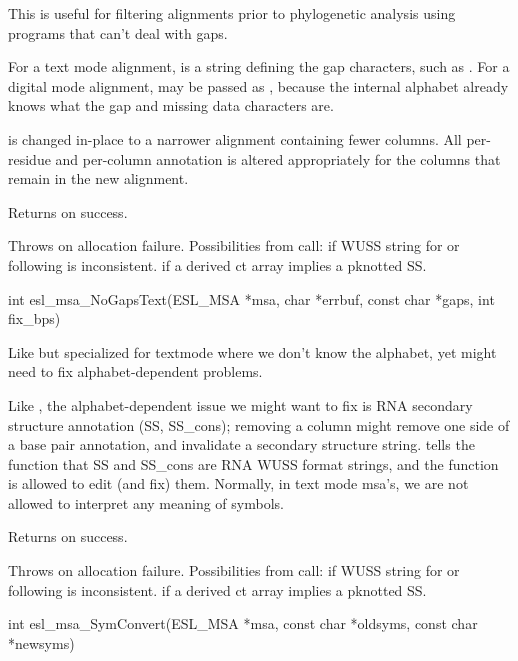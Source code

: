 \begin{sreapi}
This is useful for filtering alignments prior to
phylogenetic analysis using programs that can't deal
with gaps.

For a text mode alignment,  is a string defining
the gap characters, such as . For a digital mode
alignment,  may be passed as , because the
internal alphabet already knows what the gap and
missing data characters are.

 is changed in-place to a narrower alignment
containing fewer columns. All per-residue and per-column
annotation is altered appropriately for the columns that
remain in the new alignment.

Returns  on success.

Throws  on allocation failure.
Possibilities from  call:
 if WUSS string for  or 
following  is inconsistent.
 if a derived ct array implies a pknotted SS.



\hypertarget{func:esl_msa_NoGapsText()}
{\item[int esl\_msa\_NoGapsText(ESL\_MSA *msa, char *errbuf, const char *gaps, int fix\_bps)]}

Like  but specialized for textmode  where
we don't know the alphabet, yet might need to fix alphabet-dependent
problems. 

Like , the alphabet-dependent issue we might
want to fix is RNA secondary structure annotation (SS, SS\_cons);
removing a column might remove one side of a base pair annotation, and
invalidate a secondary structure string.  tells the function
that SS and SS\_cons are RNA WUSS format strings, and the function is
allowed to edit (and fix) them. Normally, in text mode msa's, we
are not allowed to interpret any meaning of symbols.

Returns  on success.

Throws  on allocation failure.
Possibilities from  call:
 if WUSS string for  or 
following  is inconsistent.
 if a derived ct array implies a pknotted SS.


\hypertarget{func:esl_msa_SymConvert()}
{\item[int esl\_msa\_SymConvert(ESL\_MSA *msa, const char *oldsyms, const char *newsyms)]}


\end{sreapi}
